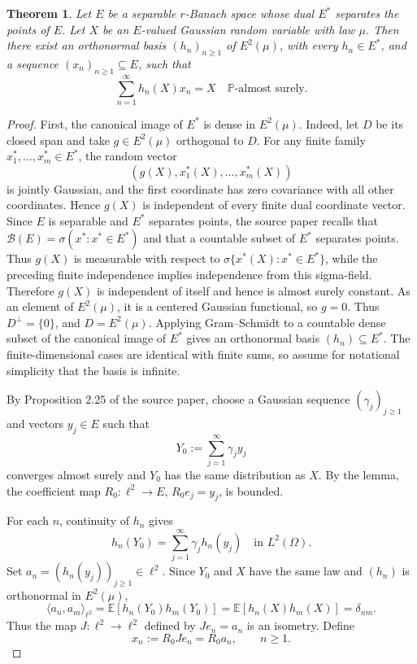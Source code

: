 \documentclass[11pt]{article}
\newtheorem{theorem}{Theorem}
\newcommand{\EE}{\mathbb E}
\newcommand{\PP}{\mathbb P}
\newcommand{\cB}{\mathcal B}
\begin{document}
\begin{theorem}
Let \(E\) be a separable \(r\)-Banach space whose dual \(E^*\) separates the
points of \(E\). Let \(X\) be an \(E\)-valued Gaussian random variable with law
\(\mu\). Then there exist an orthonormal basis
\((h_n)_{n\ge 1}\) of \(E^2(\mu)\), with every \(h_n\in E^*\), and a sequence
\((x_n)_{n\ge 1}\subseteq E\), such that
\[
  \sum_{n=1}^\infty h_n(X)x_n=X
  \quad\PP\text{-almost surely}.
\]
\end{theorem}

\begin{proof}
First, the canonical image of \(E^*\) is dense in \(E^2(\mu)\). Indeed, let
\(D\) be its closed span and take \(g\in E^2(\mu)\) orthogonal to \(D\). For
any finite family \(x_1^*,\ldots,x_m^*\in E^*\), the random vector
\[
  (g(X),x_1^*(X),\ldots,x_m^*(X))
\]
is jointly Gaussian, and the first coordinate has zero covariance with all
other coordinates. Hence \(g(X)\) is independent of every finite dual
coordinate vector. Since \(E\) is separable and \(E^*\) separates points, the
source paper recalls that \(\cB(E)=\sigma(x^*:x^*\in E^*)\) and that a
countable subset of \(E^*\) separates points. Thus \(g(X)\) is measurable with
respect to \(\sigma\{x^*(X):x^*\in E^*\}\), while the preceding finite
independence implies independence from this sigma-field. Therefore \(g(X)\)
is independent of itself and hence is almost surely constant. As an element of
\(E^2(\mu)\), it is a centered Gaussian functional, so \(g=0\). Thus
\(D^\perp=\{0\}\), and \(D=E^2(\mu)\). Applying Gram--Schmidt to a countable
dense subset of the canonical image of \(E^*\) gives an orthonormal basis
\((h_n)\subseteq E^*\). The finite-dimensional cases are identical with
finite sums, so assume for notational simplicity that the basis is infinite.

By Proposition 2.25 of the source paper, choose a Gaussian sequence
\((\gamma_j)_{j\ge 1}\) and vectors \(y_j\in E\) such that
\[
  Y_0:=\sum_{j=1}^\infty \gamma_j y_j
\]
converges almost surely and \(Y_0\) has the same distribution as \(X\). By the
lemma, the coefficient map \(R_0:\ell^2\to E\), \(R_0e_j=y_j\), is bounded.

For each \(n\), continuity of \(h_n\) gives
\[
  h_n(Y_0)
  =
  \sum_{j=1}^\infty \gamma_j h_n(y_j)
  \quad\text{in }L^2(\Omega).
\]
Set \(a_n=(h_n(y_j))_{j\ge 1}\in\ell^2\). Since \(Y_0\) and \(X\) have the
same law and \((h_n)\) is orthonormal in \(E^2(\mu)\),
\[
  \langle a_n,a_m\rangle_{\ell^2}
  =
  \EE[h_n(Y_0)h_m(Y_0)]
  =
  \EE[h_n(X)h_m(X)]
  =
  \delta_{nm}.
\]
Thus the map \(J:\ell^2\to\ell^2\) defined by \(Je_n=a_n\) is an isometry.
Define
\[
  x_n:=R_0Je_n=R_0a_n,\qquad n\ge 1.
\]


\end{proof}
\end{document}
